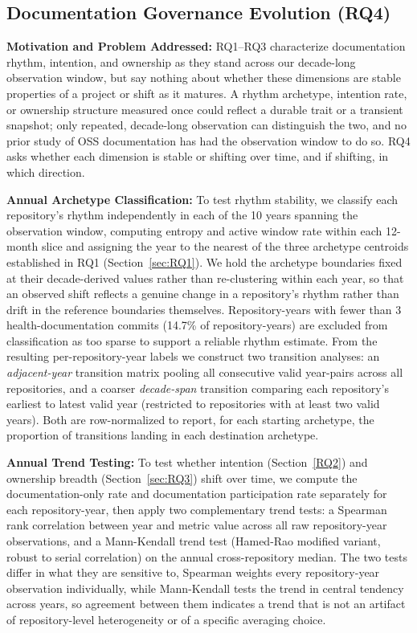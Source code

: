 \documentclass[10pt,conference]{IEEEtran}
\begin{document}
{\subsection{Documentation Governance Evolution (RQ4)}
\label{sec:RQ4}

\textbf{Motivation and Problem Addressed:}
RQ1--RQ3 characterize documentation rhythm, intention, and ownership as they stand across our decade-long observation window, but say nothing about whether these dimensions are stable properties of a project or shift as it matures. A rhythm archetype, intention rate, or ownership structure measured once could reflect a durable trait or a transient snapshot; only repeated, decade-long observation can distinguish the two, and no prior study of OSS documentation has had the observation window to do so. RQ4 asks whether each dimension is stable or shifting over time, and if shifting, in which direction.

\textbf{Annual Archetype Classification:} To test rhythm stability, we classify each repository's rhythm independently in each of the 10 years spanning the observation window, computing entropy and active window rate within each 12-month slice and assigning the year to the nearest of the three archetype centroids established in RQ1 (Section~\ref{sec:RQ1}). We hold the archetype boundaries fixed at their decade-derived values rather than re-clustering within each year, so that an observed shift reflects a genuine change in a repository's rhythm rather than drift in the reference boundaries themselves. Repository-years with fewer than 3 health-documentation commits (14.7\% of repository-years) are excluded from classification as too sparse to support a reliable rhythm estimate. From the resulting per-repository-year labels we construct two transition analyses: an \textit{adjacent-year} transition matrix pooling all consecutive valid year-pairs across all repositories, and a coarser \textit{decade-span} transition comparing each repository's earliest to latest valid year (restricted to repositories with at least two valid years). Both are row-normalized to report, for each starting archetype, the proportion of transitions landing in each destination archetype.

\textbf{Annual Trend Testing:} To test whether intention (Section~\ref{RQ2}) and ownership breadth (Section~\ref{sec:RQ3}) shift over time, we compute the documentation-only rate and documentation participation rate separately for each repository-year, then apply two complementary trend tests: a Spearman rank correlation between year and metric value across all raw repository-year observations, and a Mann-Kendall trend test (Hamed-Rao modified variant, robust to serial correlation) on the annual cross-repository median. The two tests differ in what they are sensitive to, Spearman weights every repository-year observation individually, while Mann-Kendall tests the trend in central tendency across years, so agreement between them indicates a trend that is not an artifact of repository-level heterogeneity or of a specific averaging choice.


}
\end{document}
